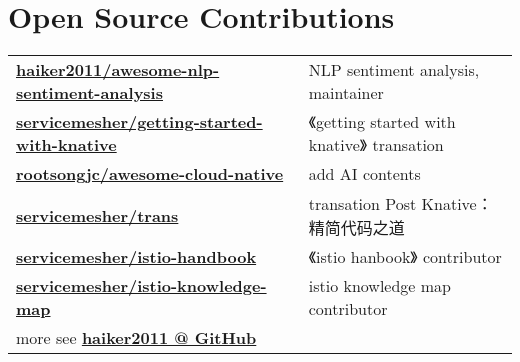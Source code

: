 \documentclass[]{deedy-resume-openfont}
\begin{document}
\begin{minipage}[t]{0.73\textwidth}




\section{Open Source Contributions}
\begin{tabular}{ll}
\href{https://github.com/haiker2011/awesome-nlp-sentiment-analysis/commits?author=haiker2011}{\bf haiker2011/awesome-nlp-sentiment-analysis} & NLP sentiment analysis, maintainer \\
\href{https://github.com/servicemesher/getting-started-with-knative/commits?author=haiker2011}{\bf servicemesher/getting-started-with-knative} & 《getting started with knative》 transation \\
\href{https://github.com/rootsongjc/awesome-cloud-native/commits?author=haiker2011}{\bf rootsongjc/awesome-cloud-native} & add AI contents \\
\href{https://github.com/servicemesher/trans/commits?author=haiker2011}{\bf servicemesher/trans} & transation Post Knative：精简代码之道 \\
\href{https://github.com/servicemesher/istio-handbook/commits?author=haiker2011}{\bf servicemesher/istio-handbook} & 《istio hanbook》 contributor \\
\href{https://github.com/servicemesher/istio-knowledge-map/commits?author=haiker2011}{\bf servicemesher/istio-knowledge-map} & istio knowledge map contributor \\
more see \href{https://github.com/haiker2011}{\bf haiker2011 @ GitHub} & \\
\end{tabular}
\sectionsep


\end{minipage}
\end{document}
